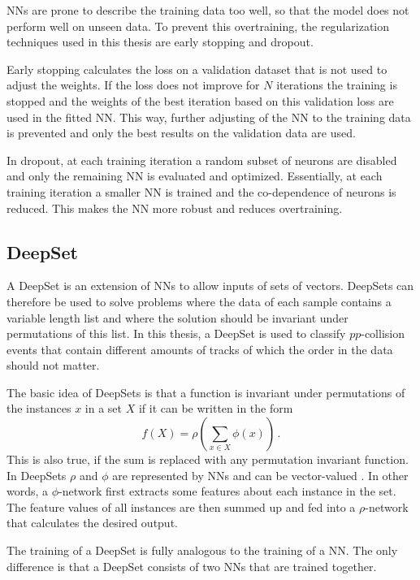 NNs are prone to describe the training data too well, so that the model does not perform well on unseen data.
To prevent this overtraining, the regularization techniques used in this thesis are early stopping and dropout.

Early stopping calculates the loss on a validation dataset that is not used to adjust the weights.
If the loss does not improve for $N$ iterations the training is stopped and the weights of the best iteration based on this validation loss are used in the fitted NN.
This way, further adjusting of the NN to the training data is prevented and only the best results on the validation data are used.

In dropout, at each training iteration a random subset of neurons are disabled and only the remaining NN is evaluated and optimized.
Essentially, at each training iteration a smaller NN is trained and the co-dependence of neurons is reduced.
This makes the NN more robust and reduces overtraining.

\subsection{DeepSet}
\label{sec:DeepSet}

A DeepSet\cite{deepset} is an extension of NNs to allow inputs of sets of vectors.
DeepSets can therefore be used to solve problems where the data of each sample contains a variable length list and where the solution should be invariant under permutations of this list.
In this thesis, a DeepSet is used to classify $pp$-collision events that contain different amounts of tracks of which the order in the data should not matter.

The basic idea of DeepSets is that a function is invariant under permutations of the instances $x$ in a set $X$ if it can be written in the form 
\begin{equation*}
    f(X) = \rho \left( \sum_{x \in X} \phi (x) \right) \, .
\end{equation*}
This is also true, if the sum is replaced with any permutation invariant function.
In DeepSets $\rho$ and $\phi$ are represented by NNs and can be vector-valued \cite{deepset}.
In other words, a $\phi$-network first extracts some features about each instance in the set.
The feature values of all instances are then summed up and fed into a $\rho$-network that calculates the desired output.

The training of a DeepSet is fully analogous to the training of a NN.
The only difference is that a DeepSet consists of two NNs that are trained together.




